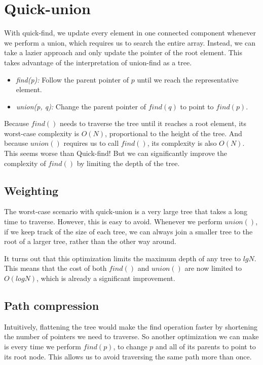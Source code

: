 \documentclass{article}
\begin{document}
\section{Quick-union}

With quick-find, we update every element in one connected component whenever we perform a union, which requires us to search the entire array. Instead, we can take a lazier approach and only update the pointer of the root element. This takes advantage of the interpretation of union-find as a tree.

\begin{itemize}
    \item \textit{find(p):} Follow the parent pointer of $p$ until we reach the representative element.
    \item \textit{union(p, q):} Change the parent pointer of $find(q)$ to point to $find(p)$.
\end{itemize}

Because $find()$ needs to traverse the tree until it reaches a root element, its worst-case complexity is $O(N)$, proportional to the height of the tree. And because $union()$ requires us to call $find()$, its complexity is also $O(N)$. This seems worse than Quick-find! But we can significantly improve the complexity of $find()$ by limiting the depth of the tree.


\subsection{Weighting}

The worst-case scenario with quick-union is a very large tree that takes a long time to traverse. However, this is easy to avoid. Whenever we perform $union()$, if we keep track of the size of each tree, we can always join a smaller tree to the root of a larger tree, rather than the other way around.

It turns out that this optimization limits the maximum depth of any tree to $lg N$. This means that the cost of both $find()$ and $union()$ are now limited to $O(log N)$, which is already a significant improvement.


\subsection{Path compression}

Intuitively, flattening the tree would make the find operation faster by shortening the number of pointers we need to traverse. So another optimization we can make is every time we perform $find(p)$, to change $p$ and all of its parents to point to its root node. This allows us to avoid traversing the same path more than once.
\end{document}
